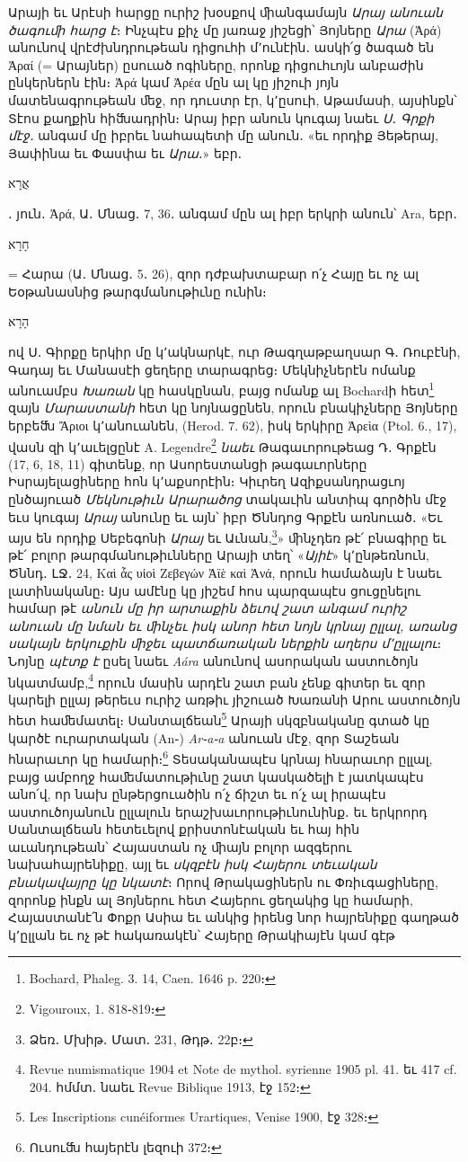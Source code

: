 \documentclass{article}
\begin{document}
{Արայի եւ Արէսի հարցը ուրիշ խօսքով ﬕանգամայն \emph{Արայ անուան ծագուﬕ հարց է}։ Ինչպէս քիչ մը յառաջ յիշեցի՝ Յոյները \emph{Արա} (Ἀρά) անունով վրէժխնդրութեան դիցուհի մ՚ունէին․ ասկի՛ց ծագած են Ἀραί (= Արայներ) ըսուած ոգիները, որոնք դիցուհւոյն անբաժին ընկերներն էին։ Ἀρά կամ Ἀρέα մըն ալ կը յիշուի յոյն մատենագրութեան ﬔջ, որ դուստր էր, կ՚ըսուի, Աթամասի, այսինքն՝ Տէոս քաղքին հիﬓադրին։ Արայ իբր անուն կուգայ նաեւ \emph{Ս․ Գրքի մէջ․} անգամ մը իբրեւ նահապետի մը անուն․ «եւ որդիք Յեթերայ, Յափինա եւ Փասփա եւ \emph{Արա․}» եբր․ \begin{hebrewfont}אֲרָא\end{hebrewfont}․ յուն․ Ἀρά, Ա․ Մնաց․ 7, 36․ անգամ մըն ալ իբր երկրի անուն՝ Ara, եբր․ \begin{hebrewfont}חָרָא\end{hebrewfont} = Հարա (Ա․ Մնաց․ 5․ 26), զոր դժբախտաբար ո՛չ Հայը եւ ոչ ալ Եօթանասնից թարգմանութիւնը ունին։ \begin{hebrewfont}הָרָא\end{hebrewfont} ով Ս․ Գիրքը երկիր մը կ՚ակնարկէ, ուր Թագղաթբաղսար Գ․ Ռուբէնի, Գադայ եւ Մանասէի ցեղերը տարագրեց։ Մեկնիչներէն ոմանք անուամբս \emph{Խառան} կը հասկընան, բայց ոմանք ալ Bochardի հետ\footnote{Bochard, Phaleg. 3. 14, Caen. 1646 p. 220։} զայն \emph{Մարաստանի} հետ կը նոյնացընեն, որուն բնակիչները Յոյները երբեﬓ Ἄριοι կ՚անուանեն, (Herod. 7. 62), իսկ երկիրը Ἀρεὶα (Ptol. 6., 17), վասն զի կ՚աւելցընէ A. Legendre\footnote{Vigouroux, 1. 818֊819։} \emph{նաեւ} Թագաւորութեաց Դ․ Գրքէն (17, 6, 18, 11) գիտենք, որ Ասորեստանցի թագաւորները Իսրայելացիները հոն կ՚աքսորէին։ Կիւրեղ Ազիքսանդրացւոյ ընծայուած \emph{Մեկնութիւն Արարածոց} տակաւին անտիպ գործին մէջ եւս կուգայ \emph{Արայ} անունը եւ այն՝ իբր Ծննդոց Գրքէն առնուած․ «Եւ այս են որդիք Սեբեգոնի \emph{Արայ} եւ Աւնան,\footnote{Ձեռ․ Մխիթ․ Մատ․ 231, Թդթ․ 22բ։}» ﬕնչդեռ թէ՛ բնագիրը եւ թէ՛ բոլոր թարգմանութիւնները Արայի տեղ՝ «\emph{Այիէ}» կ՚ընթեռնուն, Ծննդ․ ԼՋ․ 24, Καὶ ἇς υἱοὶ Ζεβεγών Ἀϊὲ καὶ Ἀνά, որուն համաձայն է նաեւ լատինականը։ Այս ամէնը կը յիշեմ հոս պարզապէս ցուցընելու համար թէ \emph{անուն մը իր արտաքին ձեւով շատ անգամ ուրիշ անուան մը նման եւ ﬕնչեւ իսկ անոր հետ նոյն կրնայ ըլլալ, առանց սակայն երկուքին ﬕջեւ պատճառական ներքին աղերս մ՚ըլլալու}։ Նոյնը \emph{պէտք է} ըսել նաեւ \emph{Aára} անունով ասորական աստուծոյն նկատմամբ,\footnote{Revue numismatique 1904 et Note de mythol. syrienne 1905 pl. 41. եւ 417 cf. 204. հմմտ․ նաեւ Revue Biblique 1913, էջ 152։} որուն մասին արդէն շատ բան չենք գիտեր եւ զոր կարելի ըլլայ թերեւս ուրիշ առթիւ յիշուած Խառանի Արու աստուծոյն հետ հաﬔմատել։ Սանտալճեան\footnote{Les Inscriptions cunéiformes Urartiques, Venise 1900, էջ 328։} Արայի սկզբնականը գտած կը կարծէ ուրարտական (An֊) \emph{Ar֊a֊a} անուան մէջ, զոր Տաշեան հնարաւոր կը համարի։\footnote{Ուսուﬓ հայերէն լեզուի 372։} Տեսականապէս կրնայ հնարաւոր ըլլալ, բայց ամբողջ հաﬔմատութիւնը շատ կասկածելի է յատկապէս անո՛վ, որ նախ ընթերցուածին ո՛չ ճիշտ եւ ո՛չ ալ իրապէս աստուծոյանուն ըլլալուն երաշխաւորութիւնունինք․ եւ երկրորդ Սանտալճեան հետեւելով քրիստոնէական եւ հայ հին աւանդութեան՝ Հայաստան ոչ ﬕայն բոլոր ազգերու նախահայրենիքը, այլ եւ \emph{սկզբէն իսկ Հայերու տեւական բնակավայրը կը նկատէ}։ Որով Թրակացիներն ու Փռիւգացիները, զորոնք ինքն ալ Յոյներու հետ Հայերու ցեղակից կը համարի, Հայաստանէ՛ն Փոքր Ասիա եւ անկից իրենց նոր հայրենիքը գաղթած կ՚ըլլան եւ ոչ թէ հակառակէն՝ Հայերը Թրակիայէն կամ գէթ }
\end{document}
